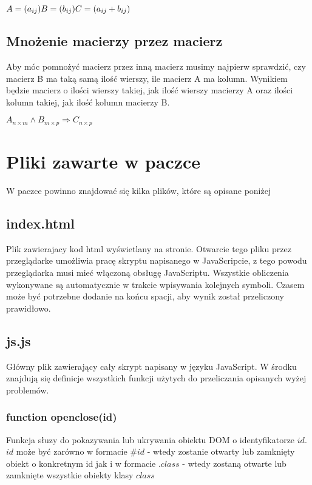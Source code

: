 \documentclass[11pt]{article}
\begin{document}
\( A = (a_{ij}) \\ B = (b_{ij}) \\ C = (a_{ij} + b_{ij}) \)

\subsection{Mnożenie macierzy przez macierz}
Aby móc pomnożyć macierz przez inną macierz musimy najpierw sprawdzić, czy macierz B ma taką samą ilość wierszy, ile macierz A ma kolumn. Wynikiem będzie macierz o ilości wierszy takiej, jak ilość wierszy macierzy A oraz ilości kolumn takiej, jak ilość kolumn macierzy B.

\( A_{n\times m} \wedge B_{m \times p} \Rightarrow C_{n \times p} \)

\section{Pliki zawarte w paczce}

W paczce powinno znajdować się kilka plików, które są opisane poniżej
\subsection{index.html}
Plik zawierajacy kod html wyświetlany na stronie. Otwarcie tego pliku przez przeglądarke umożliwia pracę skryptu napisanego w JavaScripcie, z tego powodu przeglądarka musi mieć włączoną obsługę JavaScriptu. Wszystkie obliczenia wykonywane są automatycznie w trakcie wpisywania kolejnych symboli. Czasem może być potrzebne dodanie na końcu spacji, aby wynik został przeliczony prawidłowo.

\subsection{js.js}
Główny plik zawierający cały skrypt napisany w języku JavaScript. W środku znajdują się definicje wszystkich funkcji użytych do przeliczania opisanych wyżej problemów.

\subsubsection{function openclose(id) }
Funkcja słuzy do pokazywania lub ukrywania obiektu DOM o identyfikatorze $id$.\\$id$ może być zarówno w formacie $ \# id $ - wtedy zostanie otwarty lub zamknięty obiekt o konkretnym id jak i w formacie $ .class $ - wtedy zostaną otwarte lub zamknięte wszystkie obiekty klasy $class$
\end{document}
